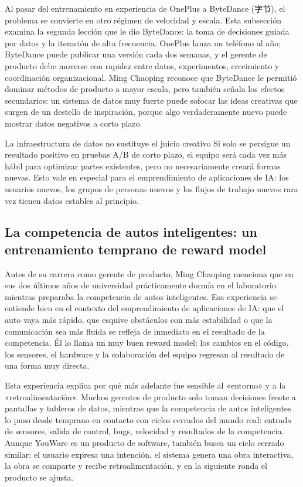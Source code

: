 Al pasar del entrenamiento en experiencia de OnePlus a ByteDance (字节), el problema se convierte en otro régimen de velocidad y escala. Esta subsección examina la segunda lección que le dio ByteDance: la toma de decisiones guiada por datos y la iteración de alta frecuencia. OnePlus lanza un teléfono al año; ByteDance puede publicar una versión cada dos semanas, y el gerente de producto debe moverse con rapidez entre datos, experimentos, crecimiento y coordinación organizacional. Ming Chaoping reconoce que ByteDance le permitió dominar métodos de producto a mayor escala, pero también señala los efectos secundarios: un sistema de datos muy fuerte puede sofocar las ideas creativas que surgen de un destello de inspiración, porque algo verdaderamente nuevo puede mostrar datos negativos a corto plazo.

\begin{warningbox}{La infraestructura de datos no sustituye el juicio creativo}
Si solo se persigue un resultado positivo en pruebas A/B de corto plazo, el equipo será cada vez más hábil para optimizar partes existentes, pero no necesariamente creará formas nuevas. Esto vale en especial para el emprendimiento de aplicaciones de IA: los usuarios nuevos, los grupos de personas nuevos y los flujos de trabajo nuevos rara vez tienen datos estables al principio.
\end{warningbox}

\subsection{La competencia de autos inteligentes: un entrenamiento temprano de reward model}

Antes de su carrera como gerente de producto, Ming Chaoping menciona que en sus dos últimos años de universidad prácticamente dormía en el laboratorio mientras preparaba la competencia de autos inteligentes. Esa experiencia se entiende bien en el contexto del emprendimiento de aplicaciones de IA: que el auto vaya más rápido, que esquive obstáculos con más estabilidad o que la comunicación sea más fluida se refleja de inmediato en el resultado de la competencia. Él lo llama un muy buen reward model: los cambios en el código, los sensores, el hardware y la colaboración del equipo regresan al resultado de una forma muy directa.

Esta experiencia explica por qué más adelante fue sensible al «entorno» y a la «retroalimentación». Muchos gerentes de producto solo toman decisiones frente a pantallas y tableros de datos, mientras que la competencia de autos inteligentes lo puso desde temprano en contacto con ciclos cerrados del mundo real: entrada de sensores, salida de control, bugs, velocidad y resultados de la competencia. Aunque YouWare es un producto de software, también busca un ciclo cerrado similar: el usuario expresa una intención, el sistema genera una obra interactiva, la obra se comparte y recibe retroalimentación, y en la siguiente ronda el producto se ajusta.


